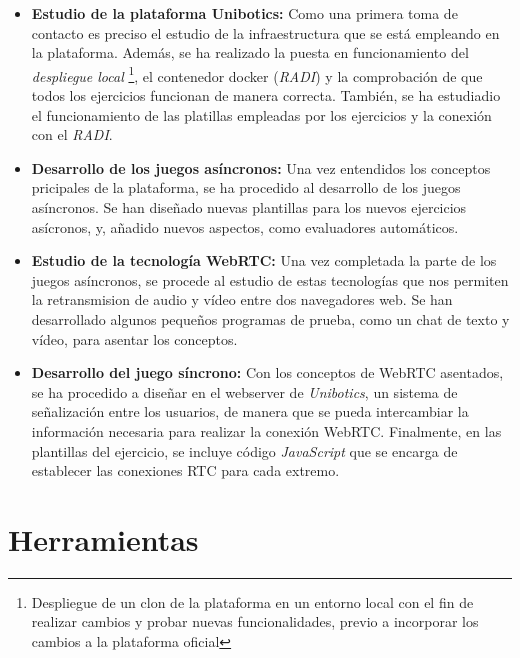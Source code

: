 \documentclass[a4paper, 12pt]{book}
\begin{document}
\begin{itemize}
\item \textbf{Estudio de la plataforma Unibotics:} Como una primera toma de contacto es preciso el estudio de la infraestructura que se está empleando en la plataforma. Además, se ha realizado la puesta en funcionamiento del \emph{despliegue local} \footnote{Despliegue de un clon de la plataforma en un entorno local con el fin de realizar cambios y probar nuevas funcionalidades, previo a incorporar los cambios a la plataforma oficial}, el contenedor docker (\emph{RADI}) y la comprobación de que todos los ejercicios funcionan de manera correcta. También, se ha estudiadio el funcionamiento de las platillas empleadas por los ejercicios y la conexión con el \emph{RADI}.

\item \textbf{Desarrollo de los juegos asíncronos:} Una vez entendidos los conceptos pricipales de la plataforma, se ha procedido al desarrollo de los juegos asíncronos. Se han diseñado nuevas plantillas para los nuevos ejercicios asícronos, y, añadido nuevos aspectos, como evaluadores automáticos.

\item \textbf{Estudio de la tecnología WebRTC:} Una vez completada la parte de los juegos asíncronos, se procede al estudio de estas tecnologías que nos permiten la retransmision de audio y vídeo entre dos navegadores web. Se han desarrollado algunos pequeños programas de prueba, como un chat de texto y vídeo, para asentar los conceptos.

\item \textbf{Desarrollo del juego síncrono:} Con los conceptos de WebRTC asentados, se ha procedido a diseñar en el webserver de \emph{Unibotics}, un sistema de señalización entre los usuarios, de manera que se pueda intercambiar la información necesaria para realizar la conexión WebRTC. Finalmente, en las plantillas del ejercicio, se incluye código \emph{JavaScript} que se encarga de establecer las conexiones RTC para cada extremo.
\end{itemize}


\cleardoublepage %
\chapter{Herramientas} 
\label{chap:herramientas}
\end{document}
